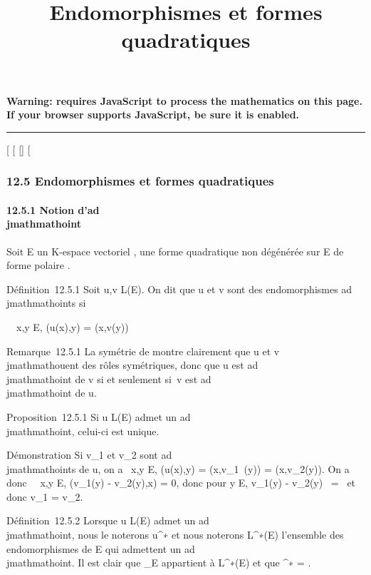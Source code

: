 \documentclass[]{article}
\title{Endomorphismes et formes quadratiques}
\author{}
\date{}
\begin{document}
\maketitle

\textbf{Warning: 
requires JavaScript to process the mathematics on this page.\\ If your
browser supports JavaScript, be sure it is enabled.}

\begin{center}\rule{3in}{0.4pt}\end{center}

{[}
{[}
{[}{]}
{[}

\subsubsection{12.5 Endomorphismes et formes quadratiques}

\paragraph{12.5.1 Notion d'ad\\jmathmathoint}

Soit E un K-espace vectoriel , \Phi une forme quadratique non dégénérée sur
E de forme polaire \phi.

Définition~12.5.1 Soit u,v \in L(E). On dit que u et v sont des
endomorphismes ad\\jmathmathoints si

\forall~~x,y \in E, \phi(u(x),y) = \phi(x,v(y))

Remarque~12.5.1 La symétrie de \phi montre clairement que u et v \\jmathmathouent des
rôles symétriques, donc que u est ad\\jmathmathoint de v si et seulement si~v est
ad\\jmathmathoint de u.

Proposition~12.5.1 Si u \in L(E) admet un ad\\jmathmathoint, celui-ci est unique.

Démonstration Si v_1 et v_2 sont ad\\jmathmathoints de u, on a
\forall~x,y \in E, \phi(u(x),y) = \phi(x,v_1~(y)) =
\phi(x,v_2(y)). On a donc \forall~~x,y \in E,
\phi(v_1(y) - v_2(y),x) = 0, donc pour y \in E,
v_1(y) - v_2(y)
\in\mathrmKer~\phi =
\0\ et donc v_1 =
v_2.

Définition~12.5.2 Lorsque u \in L(E) admet un ad\\jmathmathoint, nous le noterons
u^∗ et nous noterons L^∗(E) l'ensemble des
endomorphismes de E qui admettent un ad\\jmathmathoint. Il est clair que
\mathrmId_E appartient à L^∗(E)
et que \mathrmId^∗ =
\mathrmId.
\end{document}
